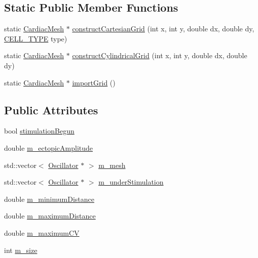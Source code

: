 \subsection*{Static Public Member Functions}
\begin{DoxyCompactItemize}
\item 
static \hyperlink{class_cardiac_mesh}{Cardiac\+Mesh} $\ast$ \hyperlink{class_cardiac_mesh_a1b47716c2b8eee65b46d9cd47e7abb8e}{construct\+Cartesian\+Grid} (int x, int y, double dx, double dy, \hyperlink{heart_defines_8h_a2f059cd81f362503874790462d535f5b}{C\+E\+L\+L\+\_\+\+T\+Y\+P\+E} type)
\item 
static \hyperlink{class_cardiac_mesh}{Cardiac\+Mesh} $\ast$ \hyperlink{class_cardiac_mesh_a706d5859f0b6d12d979ad6a102fc5f94}{construct\+Cylindrical\+Grid} (int x, int y, double dx, double dy)
\item 
static \hyperlink{class_cardiac_mesh}{Cardiac\+Mesh} $\ast$ \hyperlink{class_cardiac_mesh_ad0cfebe688a681428d5cb3f69d7cb839}{import\+Grid} ()
\end{DoxyCompactItemize}
\subsection*{Public Attributes}
\begin{DoxyCompactItemize}
\item 
bool \hyperlink{class_cardiac_mesh_ac14b1f228c8426e067df4a925824348e}{stimulation\+Begun}
\item 
double \hyperlink{class_cardiac_mesh_a4eeec3a9a09b9bc7e68ca3f7b34ea36c}{m\+\_\+ectopic\+Amplitude}
\item 
std\+::vector$<$ \hyperlink{class_oscillator}{Oscillator} $\ast$ $>$ \hyperlink{class_cardiac_mesh_acd49de8f8f878f45c927d4b75851ced6}{m\+\_\+mesh}
\item 
std\+::vector$<$ \hyperlink{class_oscillator}{Oscillator} $\ast$ $>$ \hyperlink{class_cardiac_mesh_a21749f0b4af8fe59552f97058982f695}{m\+\_\+under\+Stimulation}
\item 
double \hyperlink{class_cardiac_mesh_a100654a6bb2237fc09cef29c517818ad}{m\+\_\+minimum\+Distance}
\item 
double \hyperlink{class_cardiac_mesh_a05ed4402cf331198ee5021c65ac37e23}{m\+\_\+maximum\+Distance}
\item 
double \hyperlink{class_cardiac_mesh_a48ee051becaeae6be8d4d1b1569645d2}{m\+\_\+maximum\+C\+V}
\item 
int \hyperlink{class_cardiac_mesh_aea33a4be0162859a292958757ac934fc}{m\+\_\+size}
\end{DoxyCompactItemize}



